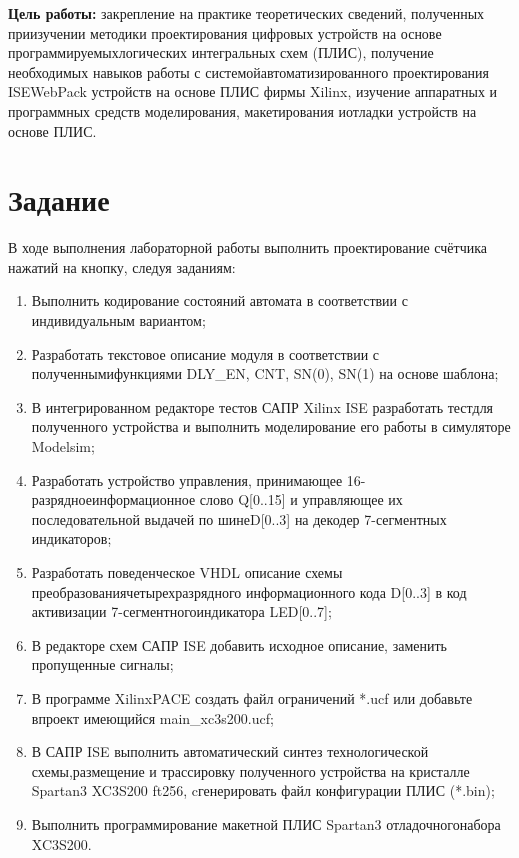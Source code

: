 \documentclass[a4paper, 14pt]{extarticle}
\begin{document}
    \graphicspath{{images/}{images2/}} %
    \renewcommand{\figurename}{Рисунок}

    \author{М.А.Гейне}
    \bmstutitlelab

    \textbf{Цель работы:} 
    закрепление на практике теоретических сведений, полученных приизучении   методики   проектирования   цифровых   устройств   на   основе   программируемыхлогических интегральных схем (ПЛИС), получение необходимых навыков работы с системойавтоматизированного проектирования  ISEWebPack  устройств на основе ПЛИС фирмы Xilinx, изучение аппаратных и программных средств моделирования, макетирования иотладки устройств на основе ПЛИС.

    \section*{Задание}
    В ходе выполнения лабораторной работы выполнить проектирование счётчика нажатий на кнопку, следуя заданиям:
    \begin{enumerate}
        \item Выполнить   кодирование   состояний   автомата в соответствии с индивидуальным вариантом;
        \item Разработать текстовое описание модуля в соответствии с полученнымифункциями DLY\_EN, CNT, SN(0), SN(1) на основе шаблона;
        \item В интегрированном редакторе тестов САПР Xilinx ISE разработать тестдля полученного устройства и выполнить моделирование его работы в симуляторе Modelsim;
        \item Разработать   устройство   управления,   принимающее   16-разрядноеинформационное слово  Q[0..15] и управляющее их последовательной выдачей по шинеD[0..3] на декодер 7-сегментных индикаторов;
        \item Разработать   поведенческое  VHDL  описание   схемы   преобразованиячетырехразрядного   информационного   кода  D[0..3]   в   код   активизации   7-сегментногоиндикатора LED[0..7];
        \item В редакторе схем САПР ISE добавить исходное описание, заменить   пропущенные   сигналы;
        \item  В программе XilinxPACE создать файл ограничений *.ucf  или добавьте впроект имеющийся main\_xc3s200.ucf;
        \item  В САПР ISE выполнить автоматический синтез технологической схемы,размещение и трассировку  полученного устройства на кристалле  Spartan3 XC3S200 ft256, cгенерировать файл конфигурации ПЛИС (*.bin);
        \item Выполнить программирование макетной ПЛИС  Spartan3 отладочногонабора XC3S200.
    \end{enumerate}
\end{document}
